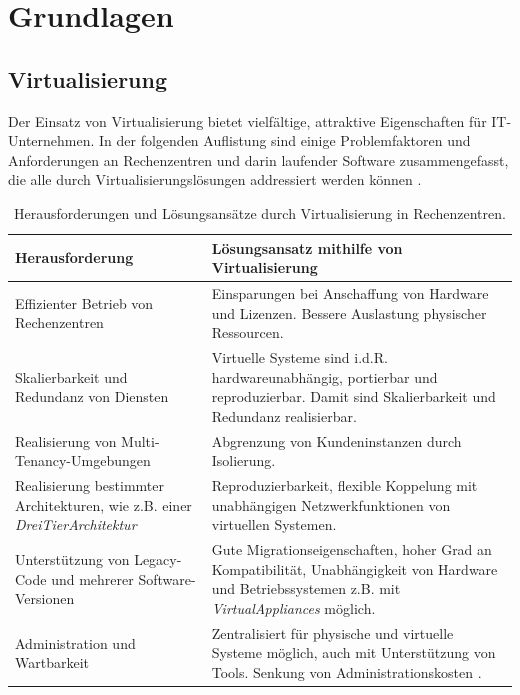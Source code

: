 \documentclass[../main.tex]{subfiles}
\begin{document}
\chapter{Grundlagen}
\label{basics}

	\section{Virtualisierung}
  \label{introVirt}
		Der Einsatz von Virtualisierung bietet vielfältige, attraktive Eigenschaften für \acrshort{IT}-Unternehmen. In der folgenden Auflistung sind einige Problemfaktoren und Anforderungen an Rechenzentren und darin laufender Software zusammengefasst, die alle durch Virtualisierungslösungen addressiert werden können \cite[S.1]{bsiVirt}\cite[S.662,672f.]{tanenbaumOS}\cite[S.299]{mandlOS}.

		\vspace{0.5cm}
		\begin{table}[htp]
			\begin{centering}
			\begin{tabularx}{\textwidth}{>{\hsize=1\hsize}X|>{\hsize=1\hsize}X}
				\hline
				\textbf{Herausforderung} & \textbf{Lösungsansatz mithilfe von Virtualisierung} \\
				\hline
				Effizienter Betrieb von Rechenzentren
				& Einsparungen bei Anschaffung von Hardware und Lizenzen. Bessere Auslastung physischer Ressourcen. \\
				\hline
				Skalierbarkeit und Redundanz von Diensten
				& Virtuelle Systeme sind i.d.R. hardwareunabhängig, portierbar und reproduzierbar. Damit sind Skalierbarkeit und Redundanz realisierbar. \\
				\hline
				Realisierung von Multi-Tenancy-Umgebungen
				& Abgrenzung von Kundeninstanzen durch Isolierung. \\
				\hline
				Realisierung bestimmter Architekturen, wie z.B. einer \emph{\gls{DreiTierArchitektur}}
				& Reproduzierbarkeit, flexible Koppelung mit unabhängigen Netzwerkfunktionen von virtuellen Systemen. \\
				\hline
				Unterstützung von Legacy-Code und mehrerer Software-Versionen
				& Gute Migrationseigenschaften, hoher Grad an Kompatibilität, Unabhängigkeit von Hardware und Betriebssystemen z.B. mit \emph{\glspl{VirtualAppliance}} möglich.\\
				\hline
				Administration und Wartbarkeit
				& Zentralisiert für physische und virtuelle Systeme möglich, auch mit Unterstützung von Tools. Senkung von Administrationskosten \cite[S.1]{bsiVirt}\cite[S.661]{tanenbaumOS}. \\
				\hline
			\end{tabularx}
			\vspace{0.5cm}
			\caption{Herausforderungen und Lösungsansätze durch Virtualisierung in Rechenzentren.}
			\label{tab:virtAdvantages}
			\end{centering}
		\end{table}
\end{document}
